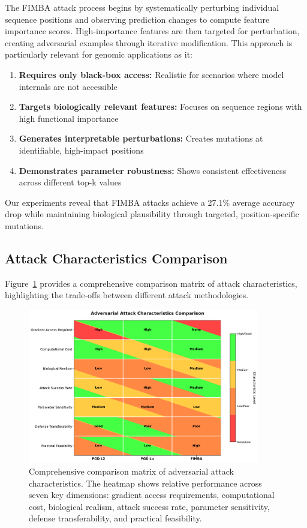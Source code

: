 \documentclass{article} %
\begin{document}
The FIMBA attack process begins by systematically perturbing individual sequence positions and observing prediction changes to compute feature importance scores. High-importance features are then targeted for perturbation, creating adversarial examples through iterative modification. This approach is particularly relevant for genomic applications as it:

\begin{enumerate}
    \item \textbf{Requires only black-box access:} Realistic for scenarios where model internals are not accessible
    \item \textbf{Targets biologically relevant features:} Focuses on sequence regions with high functional importance
    \item \textbf{Generates interpretable perturbations:} Creates mutations at identifiable, high-impact positions
    \item \textbf{Demonstrates parameter robustness:} Shows consistent effectiveness across different top-k values
\end{enumerate}

Our experiments reveal that FIMBA attacks achieve a 27.1\% average accuracy drop while maintaining biological plausibility through targeted, position-specific mutations.

\subsection{Attack Characteristics Comparison}

Figure~\ref{fig:attack_comparison} provides a comprehensive comparison matrix of attack characteristics, highlighting the trade-offs between different attack methodologies.

\begin{figure}[h]
\centering
\includegraphics[width=0.9\textwidth]{figures/attack_comparison_matrix.pdf}
\caption{Comprehensive comparison matrix of adversarial attack characteristics. The heatmap shows relative performance across seven key dimensions: gradient access requirements, computational cost, biological realism, attack success rate, parameter sensitivity, defense transferability, and practical feasibility.}
\label{fig:attack_comparison}
\end{figure}
\end{document}
